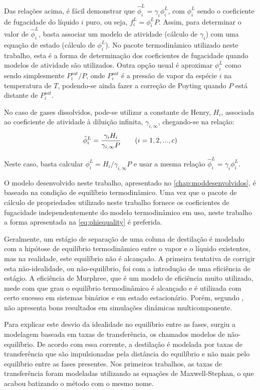 Das relações acima, é fácil demonstrar que $\hat{\phi}^L_i = \gamma_i \phi^L_i$,
com $\phi^L_i$ sendo o coeficiente de fugacidade do líquido $i$ puro, ou seja, $f^L_i = \phi^L_i P$. Assim,
para determinar o valor de $\hat{\phi}^L_i$,
basta associar um modelo de atividade (cálculo de $\gamma_i$) com uma equação de
estado (cálculo de $\phi^L_i$).
No pacote termodinâmico utilizado neste trabalho, esta é a forma de determinação
dos coeficientes de fugacidade quando modelos de atividade são utilizados.
Outra opção usual é aproximar $\phi^L_i$ como sendo simplesmente $P^{sat}_i/P$, onde
$P^{sat}_i$ é a pressão de vapor da espécie $i$ na temperatura de $T$, podendo-se ainda
fazer a correção de Poyting quando $P$ está distante de $P^{sat}_i$.

No caso de gases dissolvidos, pode-se utilizar a constante de Henry, $H_i$, associada ao coeficiente de
atividade à diluição infinita, $\gamma_{i,\infty}$, chegando-se na relação:
\begin{equation}
\hat{\phi}^L_i = \dfrac{\gamma_i H_i}{\gamma_{i,\infty} P} \qquad (i = 1,2,...,c) \\
\label{eq:gammadefinitionHenry}
\end{equation}

Neste caso, basta calcular $\phi^L_i = H_i / \gamma_{i,\infty} P$ e usar a mesma relação
$\hat{\phi}^L_i = \gamma_i \phi^L_i$.

O modelo desenvolvido neste trabalho, apresentado no \autoref{chap:moddesenvolvidos}, é baseado na condição de equilíbrio
termodinâmico.
Uma vez que o pacote de cálculo de propriedades utilizado neste trabalho
fornece os coeficientes de fugacidade independentemente do modelo termodinâmico
em uso, neste trabalho a forma apresentada na \autoref{eq:phiequality} é
preferida.

Geralmente, um estágio de separação de uma coluna de destilação é modelado com a hipótose de equilíbrio  termodinâmico
entre o vapor e o líquido existentes, mas na realidade, este equilíbrio não é alcançado. A primeira tentativa de corrigir
esta não-idealidade, ou não-equilíbrio, foi com a introdução de uma eficiência de estágio.
A eficiência de Murphree, que é um modelo de
eficiência muito utilizado, mede com que grau o equilíbrio termodinâmico é alcançado e é utilizada com certo sucesso em
sistemas binários e em estado estacionário. Porém, segundo , não apresenta bons resultados
em simulações dinâmicas multicomponente.

Para explicar este desvio da idealidade no equilíbrio entre as fases, surgiu a
modelagem baseada em taxas de transferência, os chamados modelos de não-equilíbrio. De acordo com
essa corrente, a destilação é modelada por taxas de transferência que são
impulsionadas pela distância do equilíbrio e não mais pelo equilíbrio entre as
fases presentes. Nos primeiros trabalhos, as taxas de transferência foram modeladas
utilizando as equações de Maxwell-Stephan, o que acabou batizando o método
com o mesmo nome.

